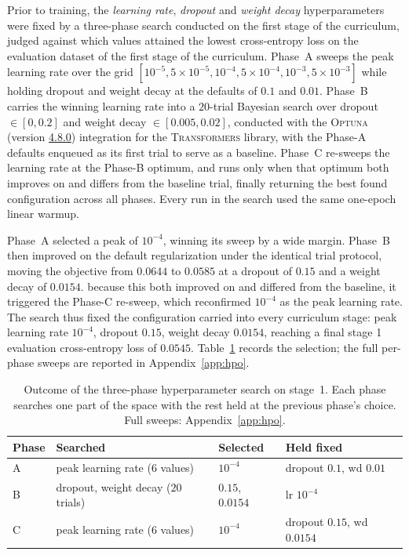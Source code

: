 \documentclass[titlepage,a4paper,11pt]{report}
\begin{document}
    Prior to training, the \textit{learning rate}, \textit{dropout} and \textit{weight decay} hyperparameters were fixed by a three-phase search conducted on the first stage of the curriculum, judged against which values attained the lowest cross-entropy loss on the evaluation dataset of the first stage of the curriculum. Phase~A sweeps the peak learning rate over the grid $[10^{-5}, 5\times10^{-5}, 10^{-4}, 5\times10^{-4}, 10^{-3}, 5\times10^{-3}]$ while holding dropout and weight decay at the defaults of $0.1$ and $0.01$. Phase~B carries the winning learning rate into a $20$-trial Bayesian search over dropout $\in [0, 0.2]$ and weight decay $\in [0.005, 0.02]$, conducted with the \textsc{Optuna} (version \href{https://github.com/optuna/optuna/tree/v4.8.0}{4.8.0}) integration for the \textsc{Transformers} library, with the Phase-A defaults enqueued as its first trial to serve as a baseline. Phase~C re-sweeps the learning rate at the Phase-B optimum, and runs only when that optimum both improves on and differs from the baseline trial, finally returning the best found configuration across all phases. Every run in the search used the same one-epoch linear warmup.
    
    Phase~A selected a peak of $10^{-4}$, winning its sweep by a wide margin. Phase~B then improved on the default regularization under the identical trial protocol, moving the objective from $0.0644$ to $0.0585$ at a dropout of $0.15$ and a weight decay of $0.0154$. because this both improved on and differed from the baseline, it triggered the Phase-C re-sweep, which reconfirmed $10^{-4}$ as the peak learning rate. The search thus fixed the configuration carried into every curriculum stage: peak learning rate $10^{-4}$, dropout $0.15$, weight decay $0.0154$, reaching a final stage 1 evaluation cross-entropy loss of $0.0545$. Table~\ref{tab:hpo_summary} records the selection; the full per-phase sweeps are reported in Appendix~\ref{app:hpo}.
    
    \begin{table}[ht]
        \centering
        \caption{Outcome of the three-phase hyperparameter search on stage~1. Each phase searches one part of the space with the rest held at the previous phase's choice. Full sweeps: Appendix~\ref{app:hpo}.}
        \label{tab:hpo_summary}
        \begin{tabular}{llll}
            \toprule
            Phase & Searched & Selected & Held fixed \\
            \midrule
            A & peak learning rate ($6$ values)   & $10^{-4}$        & dropout $0.1$, wd $0.01$ \\
            B & dropout, weight decay ($20$ trials) & $0.15$, $0.0154$ & lr $10^{-4}$ \\
            C & peak learning rate ($6$ values)   & $10^{-4}$        & dropout $0.15$, wd $0.0154$ \\
            \bottomrule
        \end{tabular}
    \end{table}
    
\end{document}
